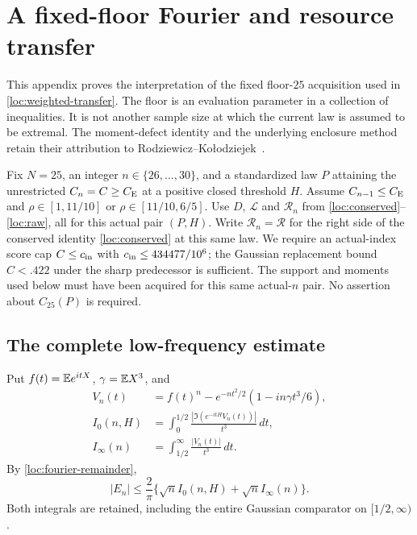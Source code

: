 \section{A fixed-floor Fourier and resource transfer}\label{ut:section}

This appendix proves the interpretation of the fixed floor-$25$
acquisition used in \eqref{loc:weighted-transfer}. The floor is an
evaluation parameter in a collection of inequalities. It is not another
sample size at which the current law is assumed to be extremal.
The moment-defect identity and the underlying enclosure method retain
their attribution to Rodziewicz--Ko\l{}odziejek~\cite{RK2026}.

Fix $N=25$, an integer $n\in\{26,\ldots,30\}$, and a standardized law
$P$ attaining the unrestricted $C_n=C\ge C_{\mathrm E}$ at a positive closed
threshold $H$. Assume $C_{n-1}\le C_{\mathrm E}$ and
$\rho\in[1,11/10]$ or $\rho\in[11/10,6/5]$.
Use $D$, $\mathcal L$ and $\mathcal R_n$ from
\eqref{loc:conserved}--\eqref{loc:raw}, all for this actual pair $(P,H)$.
Write $\mathcal R_n=\mathcal R$ for the right side of
the conserved identity \eqref{loc:conserved} at this same law.
We require an actual-index score cap $C\le c_{\rm in}$ with
$c_{\rm in}\le434477/10^6$; the Gaussian replacement bound
$C<.422$ under the sharp predecessor is sufficient.
The support and moments used below must have been acquired for this
same actual-$n$ pair. No assertion about $C_{25}(P)$ is required.

\subsection{The complete low-frequency estimate}

Put $f(t)=\mathbb E e^{itX}$, $\gamma=\mathbb E X^3$, and
\begin{align*}
 V_n(t)&=f(t)^n-e^{-nt^2/2}(1-in\gamma t^3/6),\\
 I_0(n,H)&=\int_0^{1/2}\frac{|\Im(e^{-itH}V_n(t))|}{t^3}\,dt,\\
 I_\infty(n)&=\int_{1/2}^{\infty}\frac{|V_n(t)|}{t^3}\,dt.
\end{align*}
By \eqref{loc:fourier-remainder},
\begin{equation}\label{ut:split}
 |E_n|\le\frac2\pi\{\sqrt n I_0(n,H)+\sqrt n I_\infty(n)\}.
\end{equation}
Both integrals are retained, including the entire Gaussian comparator
on $[1/2,\infty)$.

